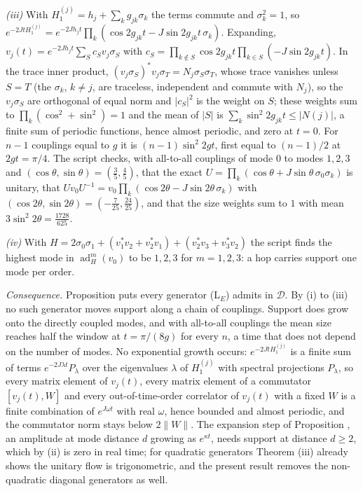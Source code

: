 \emph{(iii)} With $H_{1}^{(j)} = h_{j} + \sum_{k}g_{jk}\sigma_{k}$ the terms commute and $\sigma_{k}^{2} = 1$, so $e^{-2JtH_{1}^{(j)}} = e^{-2Jh_{j}t}\prod_{k}(\cos 2g_{jk}t - J\sin 2g_{jk}t\,\sigma_{k})$. Expanding, $v_{j}(t) = e^{-2Jh_{j}t}\sum_{S}c_{S}v_{j}\sigma_{S}$ with $c_{S} = \prod_{k \notin S}\cos 2g_{jk}t\prod_{k \in S}(-J\sin 2g_{jk}t)$. In the trace inner product, $(v_{j}\sigma_{S})^{*}v_{j}\sigma_{T} = N_{j}\sigma_{S}\sigma_{T}$, whose trace vanishes unless $S = T$ (the $\sigma_{k}$, $k \neq j$, are traceless, independent and commute with $N_{j}$), so the $v_{j}\sigma_{S}$ are orthogonal of equal norm and $|c_{S}|^{2}$ is the weight on $S$; these weights sum to $\prod_{k}(\cos^{2} + \sin^{2}) = 1$ and the mean of $|S|$ is $\sum_{k}\sin^{2}2g_{jk}t \le |N(j)|$, a finite sum of periodic functions, hence almost periodic, and zero at $t = 0$. For $n - 1$ couplings equal to $g$ it is $(n-1)\sin^{2}2gt$, first equal to $(n-1)/2$ at $2gt = \pi/4$. The script checks, with all-to-all couplings of mode $0$ to modes $1, 2, 3$ and $(\cos\theta, \sin\theta) = (\tfrac35, \tfrac45)$, that the exact $U = \prod_{k}(\cos\theta + J\sin\theta\,\sigma_{0}\sigma_{k})$ is unitary, that $Uv_{0}U^{-1} = v_{0}\prod_{k}(\cos 2\theta - J\sin 2\theta\,\sigma_{k})$ with $(\cos 2\theta, \sin 2\theta) = (-\tfrac{7}{25}, \tfrac{24}{25})$, and that the size weights sum to $1$ with mean $3\sin^{2}2\theta = \tfrac{1728}{625}$.

\emph{(iv)} With $H = 2\sigma_{0}\sigma_{1} + (v_{1}^{*}v_{2} + v_{2}^{*}v_{1}) + (v_{2}^{*}v_{3} + v_{3}^{*}v_{2})$ the script finds the highest mode in $\operatorname{ad}_{H}^{m}(v_{0})$ to be $1, 2, 3$ for $m = 1, 2, 3$: a hop carries support one mode per order.

\emph{Consequence.} Proposition  puts every generator (L$_{E}$) admits in $\mathcal{D}$. By (i) to (iii) no such generator moves support along a chain of couplings. Support does grow onto the directly coupled modes, and with all-to-all couplings the mean size reaches half the window at $t = \pi/(8g)$ for every $n$, a time that does not depend on the number of modes. No exponential growth occurs: $e^{-2JtH_{1}^{(j)}}$ is a finite sum of terms $e^{-2J\lambda t}P_{\lambda}$ over the eigenvalues $\lambda$ of $H_{1}^{(j)}$ with spectral projections $P_{\lambda}$, so every matrix element of $v_{j}(t)$, every matrix element of a commutator $[v_{j}(t), W]$ and every out-of-time-order correlator of $v_{j}(t)$ with a fixed $W$ is a finite combination of $e^{J\omega t}$ with real $\omega$, hence bounded and almost periodic, and the commutator norm stays below $2\|W\|$. The expansion step of Proposition , an amplitude at mode distance $d$ growing as $e^{\kappa t}$, needs support at distance $d \ge 2$, which by (ii) is zero in real time; for quadratic generators Theorem (iii) already shows the unitary flow is trigonometric, and the present result removes the non-quadratic diagonal generators as well.
